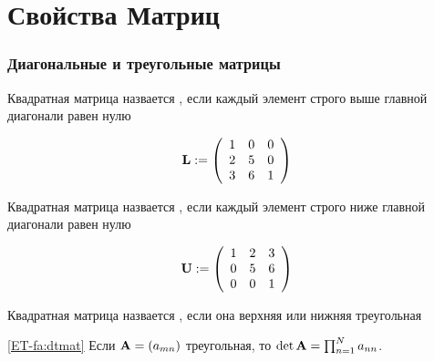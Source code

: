 \section{Свойства Матриц}

\begin{frame}\frametitle{Диагональные и треугольные матрицы}
    
    \vspace{2em}
    Квадратная матрица назвается , если каждый элемент 
    строго выше главной диагонали равен нулю
    
    \vspace{.7em}
    \Eg
    \begin{equation*}
        \label{eq:ltute}
        \mathbf L :=
        \left(
        \begin{array}{ccc}
            1 & 0 & 0  \\
            2 & 5 & 0 \\
            3 & 6 & 1
        \end{array}
        \right)
    \end{equation*}
    
\end{frame}

\begin{frame}

    \vspace{2em}
    Квадратная матрица назвается , если каждый элемент 
    строго ниже главной диагонали равен нулю

    \vspace{.7em}
    \Eg
    \begin{equation*}
        \mathbf U :=
        \left(
        \begin{array}{ccc}
            1 & 2 & 3  \\
            0 & 5 & 6 \\
            0 & 0 & 1
        \end{array}
        \right)
    \end{equation*}
    
    \vspace{.7em}
    Квадратная матрица назвается , если она верхняя или 
    нижняя треугольная

    \vspace{.7em}
    \Fact\eqref{ET-fa:dtmat}
    Если $\mathbf A = (a_{mn})$ треугольная, то $\det \mathbf A = \prod_{n=1}^N a_{nn}$.
    
\end{frame}

